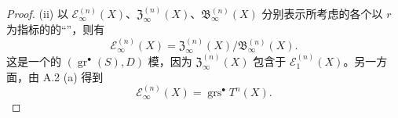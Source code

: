 \begin{proof}
(ii) 以 $\mathscr E_\infty^{(n)}(X)$、$\mathfrak Z_\infty^{(n)}(X)$、$\mathfrak B_\infty^{(n)}(X)$ 分别表示所考虑的各个以 $r$ 为指标的的“”，则有
\[
\mathscr E_\infty^{(n)}(X)=\mathfrak Z_\infty^{(n)}(X)/\mathfrak B_\infty^{(n)}(X).
\]
这是一个的 $(\operatorname{gr}^{\bullet}(S),D)$ 模，因为 $\mathfrak Z_\infty^{(n)}(X)$ 包含于 $\mathscr E_1^{(n)}(X)$。另一方面，由 A.2 (a) 得到
\[
\mathscr E_\infty^{(n)}(X)=\operatorname{grs}^{\bullet}T^n(X).
\]
\end{proof}
